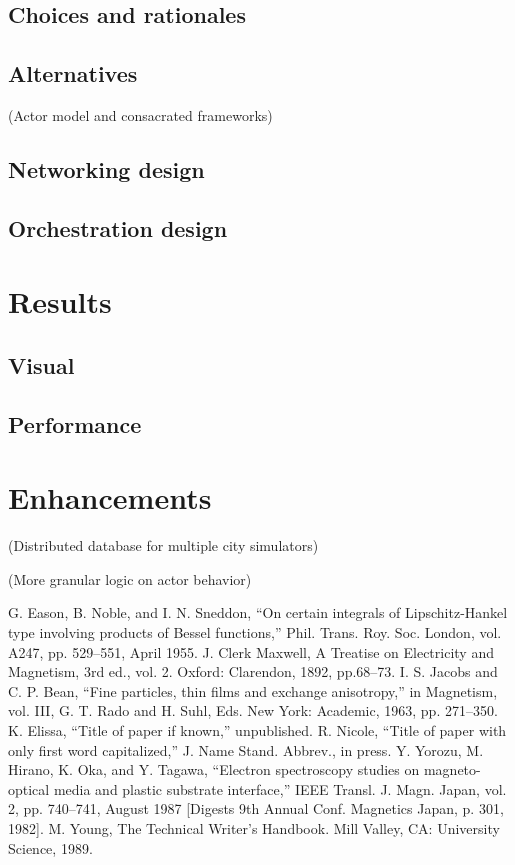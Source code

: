 \documentclass[conference]{IEEEtran}
\begin{document}
\subsection{Choices and rationales}

\subsection{Alternatives}
(Actor model and consacrated frameworks)

\subsection{Networking design}

\subsection{Orchestration design}

\section{Results}

\subsection{Visual}

\subsection{Performance}

\section{Enhancements}
(Distributed database for multiple city simulators)

(More granular logic on actor behavior)

\begin{thebibliography}{00}
 G. Eason, B. Noble, and I. N. Sneddon, ``On certain integrals of Lipschitz-Hankel type involving products of Bessel functions,'' Phil. Trans. Roy. Soc. London, vol. A247, pp. 529--551, April 1955.
 J. Clerk Maxwell, A Treatise on Electricity and Magnetism, 3rd ed., vol. 2. Oxford: Clarendon, 1892, pp.68--73.
 I. S. Jacobs and C. P. Bean, ``Fine particles, thin films and exchange anisotropy,'' in Magnetism, vol. III, G. T. Rado and H. Suhl, Eds. New York: Academic, 1963, pp. 271--350.
 K. Elissa, ``Title of paper if known,'' unpublished.
 R. Nicole, ``Title of paper with only first word capitalized,'' J. Name Stand. Abbrev., in press.
 Y. Yorozu, M. Hirano, K. Oka, and Y. Tagawa, ``Electron spectroscopy studies on magneto-optical media and plastic substrate interface,'' IEEE Transl. J. Magn. Japan, vol. 2, pp. 740--741, August 1987 [Digests 9th Annual Conf. Magnetics Japan, p. 301, 1982].
 M. Young, The Technical Writer's Handbook. Mill Valley, CA: University Science, 1989.
\end{thebibliography}
\vspace{12pt}
\end{document}
